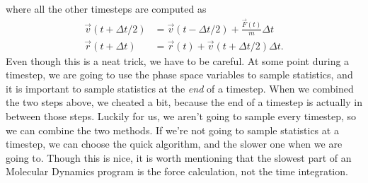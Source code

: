 where all the other timesteps are computed as
\begin{align}
	\vec v(t + \Delta t/2) &= \vec v(t - \Delta t/2) + \frac{\vec F(t)}{m}\Delta t\\
	\vec r(t + \Delta t) &= \vec r(t) + \vec v(t + \Delta t/2)\Delta t.
\end{align}
Even though this is a neat trick, we have to be careful. At some point during a timestep, we are going to use the phase space variables to sample statistics, and it is important to sample statistics at the \textit{end} of a timestep. When we combined the two steps above, we cheated a bit, because the end of a timestep is actually in between those steps. Luckily for us, we aren't going to sample every timestep, so we can combine the two methods. If we're not going to sample statistics at a timestep, we can choose the quick algorithm, and the slower one when we are going to. Though this is nice, it is worth mentioning that the slowest part of an Molecular Dynamics program is the force calculation, not the time integration. 